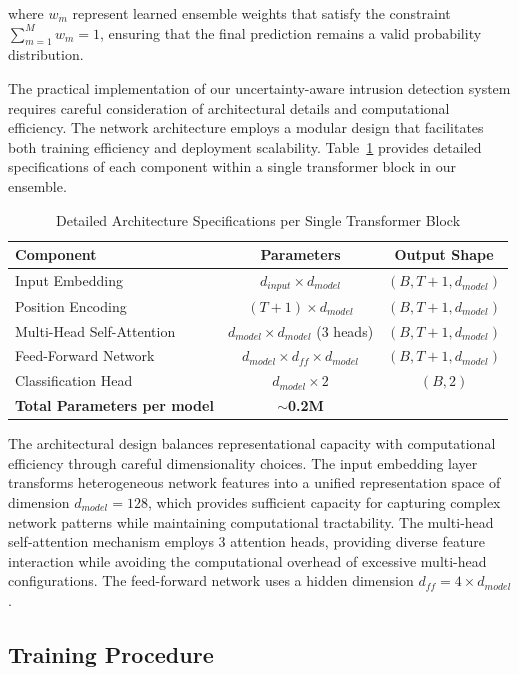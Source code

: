 \documentclass[journal]{IEEEtran}
\begin{document}
where $w_m$ represent learned ensemble weights that satisfy the constraint $\sum_{m=1}^M w_m = 1$, ensuring that the final prediction remains a valid probability distribution.

The practical implementation of our uncertainty-aware intrusion detection system requires careful consideration of architectural details and computational efficiency. The network architecture employs a modular design that facilitates both training efficiency and deployment scalability. Table~\ref{tab:architecture} provides detailed specifications of each component within a single transformer block in our ensemble.

\begin{table}[t]
\centering
\caption{Detailed Architecture Specifications per Single Transformer Block}
\label{tab:architecture}
\begin{tabular}{@{}lcc@{}}
\toprule
\textbf{Component} & \textbf{Parameters} & \textbf{Output Shape} \\
\midrule
Input Embedding & $d_{input} \times d_{model}$ & $(B, T+1, d_{model})$ \\
Position Encoding & $(T+1) \times d_{model}$ & $(B, T+1, d_{model})$ \\
Multi-Head Self-Attention & $d_{model} \times d_{model}$ (3 heads) & $(B, T+1, d_{model})$ \\
Feed-Forward Network & $d_{model} \times d_{ff} \times d_{model}$ & $(B, T+1, d_{model})$ \\
Classification Head & $d_{model} \times 2$ & $(B, 2)$ \\
\midrule
\textbf{Total Parameters per model} & \textbf{$\sim$0.2M} & \\
\bottomrule
\end{tabular}
\end{table}

The architectural design balances representational capacity with computational efficiency through careful dimensionality choices. The input embedding layer transforms heterogeneous network features into a unified representation space of dimension $d_{model} = 128$, which provides sufficient capacity for capturing complex network patterns while maintaining computational tractability. The multi-head self-attention mechanism employs 3 attention heads, providing diverse feature interaction while avoiding the computational overhead of excessive multi-head configurations. The feed-forward network uses a hidden dimension $d_{ff} = 4 \times d_{model}$.

\subsection{Training Procedure}
\end{document}

